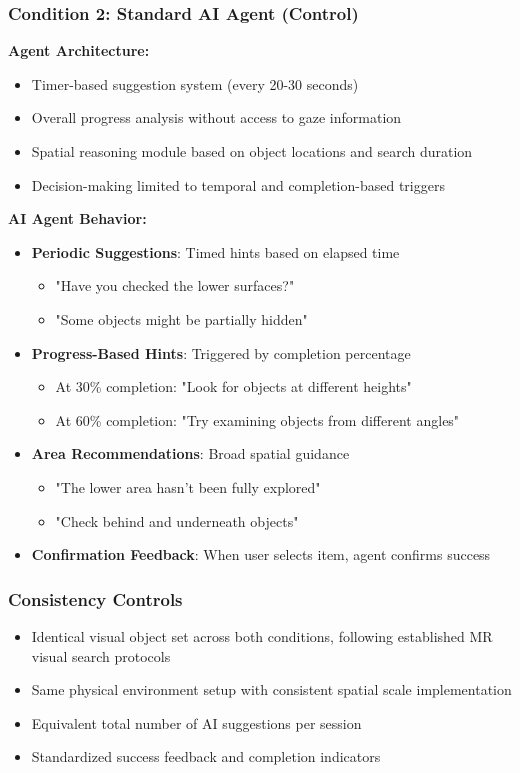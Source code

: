 \documentclass[12pt,letterpaper]{article}
\begin{document}
\subsubsection{Condition 2: Standard AI Agent (Control)}

\textbf{Agent Architecture:}
\begin{itemize}
    \item Timer-based suggestion system (every 20-30 seconds)
    \item Overall progress analysis without access to gaze information
    \item Spatial reasoning module based on object locations and search duration
    \item Decision-making limited to temporal and completion-based triggers
\end{itemize}

\textbf{AI Agent Behavior:}
\begin{itemize}
    \item \textbf{Periodic Suggestions}: Timed hints based on elapsed time
    \begin{itemize}
        \item "Have you checked the lower surfaces?"
        \item "Some objects might be partially hidden"
    \end{itemize}
    \item \textbf{Progress-Based Hints}: Triggered by completion percentage
    \begin{itemize}
        \item At 30\% completion: "Look for objects at different heights"
        \item At 60\% completion: "Try examining objects from different angles"
    \end{itemize}
    \item \textbf{Area Recommendations}: Broad spatial guidance
    \begin{itemize}
        \item "The lower area hasn't been fully explored"
        \item "Check behind and underneath objects"
    \end{itemize}
    \item \textbf{Confirmation Feedback}: When user selects item, agent confirms success
\end{itemize}

\subsubsection{Consistency Controls}
\begin{itemize}
    \item Identical visual object set across both conditions, following established MR visual search protocols \citep{chiossi2024searching}
    \item Same physical environment setup with consistent spatial scale implementation \citep{barba2017primer}
    \item Equivalent total number of AI suggestions per session
    \item Standardized success feedback and completion indicators
\end{itemize}
\end{document}
